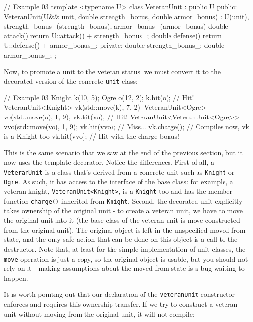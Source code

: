 \begin{code}
// Example 03
template <typename U>
class VeteranUnit : public U {
  public:
  VeteranUnit(U&& unit,
              double strength_bonus,
              double armor_bonus) :
    U(unit), strength_bonus_(strength_bonus),
    armor_bonus_(armor_bonus) {}
  double attack() { return U::attack() + strength_bonus_; }
  double defense() { return U::defense() + armor_bonus_; }
  private:
  double strength_bonus_;
  double armor_bonus_;
};
\end{code}

Now, to promote a unit to the veteran status, we must convert it to the decorated version of the concrete \texttt{unit} class:

\begin{code}
// Example 03
Knight k(10, 5);
Ogre o(12, 2);
k.hit(o); // Hit!
VeteranUnit<Knight> vk(std::move(k), 7, 2);
VeteranUnit<Ogre> vo(std::move(o), 1, 9);
vk.hit(vo); // Hit!
VeteranUnit<VeteranUnit<Ogre>> vvo(std::move(vo), 1, 9);
vk.hit(vvo); // Miss...
vk.charge(); // Compiles now, vk is a Knight too
vk.hit(vvo); // Hit with the charge bonus!
\end{code}

This is the same scenario that we saw at the end of the previous section, but it now uses the template decorator. Notice the differences. First of all, a \texttt{VeteranUnit} is a class that's derived from a concrete unit such as \texttt{Knight} or \texttt{Ogre}. As such, it has access to the interface of the base class: for example, a veteran knight, \texttt{VeteranUnit\textless{}Knight\textgreater{}}, is a \texttt{Knight} too and has the member function \texttt{charge()} inherited from \texttt{Knight}. Second, the decorated unit explicitly takes ownership of the original unit - to create a veteran unit, we have to move the original unit into it (the base class of the veteran unit is move-constructed from the original unit). The original object is left in the unspecified moved-from state, and the only safe action that can be done on this object is a call to the destructor. Note that, at least for the simple implementation of unit classes, the \texttt{move} operation is just a copy, so the original object is usable, but you should not rely on it - making assumptions about the moved-from state is a bug waiting to happen.

It is worth pointing out that our declaration of the \texttt{VeteranUnit} constructor enforces and requires this ownership transfer. If we try to construct a veteran unit without moving from the original unit, it will not compile:

